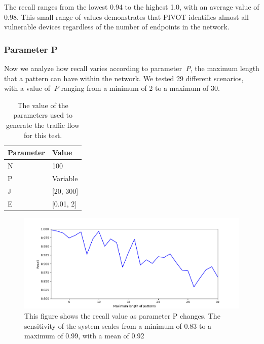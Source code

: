 The recall ranges from the lowest 0.94 to the highest 1.0, with an average value of 0.98. This small range of values demonstrates that PIVOT identifies almost all vulnerable devices regardless of the number of endpoints in the network.

\vspace{3mm}

\subsubsection{Parameter P}
Now we analyze how recall varies according to parameter \(\ P \), the maximum length that a pattern can have within the network. We tested 29 different scenarios, with a value of \(\ P \) ranging from a minimum of 2 to a maximum of 30.

\vspace{3mm}
\begin{table}[H]
\centering
\caption{The value of the parameters used to generate the traffic flow for this test.}
\label{tab:parameter_P}
\begin{tabular}{|l|l|}
\hline
\multicolumn{1}{|c|}{\textbf{Parameter}} & \textbf{Value} \\ \hline
N                                        & 100            \\ \hline
P                                        & Variable              \\ \hline
J                                     & [20, 300]             \\ \hline
E                                     & [0.01, 2]           \\ \hline
\end{tabular}
\end{table}
\vspace{3mm}

\vspace{3mm}
\begin{figure}[H]
    \centering
    \includegraphics[width=1\linewidth]{images/implementation/P.png}
    \caption{This figure shows the recall value as parameter P changes. The sensitivity of the system scales from a minimum of 0.83 to a maximum of 0.99, with a mean of 0.92}
    \label{fig:testp}
\end{figure}
\vspace{3mm}

